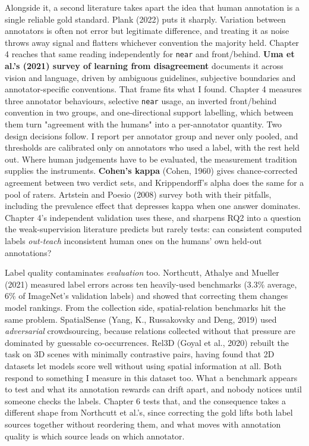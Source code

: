 Alongside it, a second literature takes apart the idea that human annotation is a single reliable gold standard. Plank (2022) puts it sharply. Variation between annotators is often not error but legitimate difference, and treating it as noise throws away signal and flatters whichever convention the majority held. Chapter 4 reaches that same reading independently for \texttt{near} and front/behind. \textbf{Uma et al.'s (2021) survey of learning from disagreement} documents it across vision and language, driven by ambiguous guidelines, subjective boundaries and annotator-specific conventions. That frame fits what I found. Chapter 4 measures three annotator behaviours, selective \texttt{near} usage, an inverted front/behind convention in two groups, and one-directional support labelling, which between them turn "agreement with the humans" into a per-annotator quantity. Two design decisions follow. I report per annotator group and never only pooled, and thresholds are calibrated only on annotators who used a label, with the rest held out. Where human judgements have to be evaluated, the measurement tradition supplies the instruments. \textbf{Cohen's kappa} (Cohen, 1960) gives chance-corrected agreement between two verdict sets, and Krippendorff's alpha does the same for a pool of raters. Artstein and Poesio (2008) survey both with their pitfalls, including the prevalence effect that depresses kappa when one answer dominates. Chapter 4's independent validation uses these, and sharpens RQ2 into a question the weak-supervision literature predicts but rarely tests: can consistent computed labels \textit{out-teach} inconsistent human ones on the humans' own held-out annotations?

Label quality contaminates \textit{evaluation} too. Northcutt, Athalye and Mueller (2021) measured label errors across ten heavily-used benchmarks (3.3\% average, 6\% of ImageNet's validation labels) and showed that correcting them changes model rankings. From the collection side, spatial-relation benchmarks hit the same problem. SpatialSense (Yang, K., Russakovsky and Deng, 2019) used \textit{adversarial} crowdsourcing, because relations collected without that pressure are dominated by guessable co-occurrences. Rel3D (Goyal et al., 2020) rebuilt the task on 3D scenes with minimally contrastive pairs, having found that 2D datasets let models score well without using spatial information at all. Both respond to something I measure in this dataset too. What a benchmark appears to test and what its annotation rewards can drift apart, and nobody notices until someone checks the labels. Chapter 6 tests that, and the consequence takes a different shape from Northcutt et al.'s, since correcting the gold lifts both label sources together without reordering them, and what moves with annotation quality is which source leads on which annotator.

